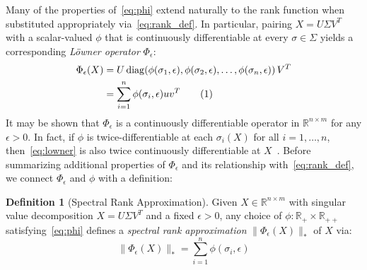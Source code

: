 \documentclass[10pt]{article}
\numberwithin{equation}{section}
\newcommand{\+}{%
	\raisebox{0.18ex}{\scaleobj{0.55}{+}}
}
\theoremstyle{definition}
\newtheorem{definition}{Definition}
\theoremstyle{definition}
\newcommand\numberthis{\addtocounter{equation}{1}\tag{\theequation}}
\begin{document}
Many of the properties of~\eqref{eq:phi} extend naturally to the rank function when substituted appropriately via~\eqref{eq:rank_def}.
In particular, pairing $X = U\Sigma V^T$ with a scalar-valued $\phi$ that is continuously differentiable at every $\sigma \in \Sigma$ yields a corresponding \emph{Löwner operator} $\Phi_\epsilon$: 
\begin{align*}\label{eq:lowner}
 \Phi_\epsilon (X) & = U \, \mathrm{diag}( \phi(\sigma_1, \epsilon), \phi(\sigma_2, \epsilon), \dots, \phi(\sigma_n, \epsilon)) \, V^T \\
 & = \sum\limits_{i=1}^{n} \phi(\sigma_i, \epsilon) u v^T\numberthis
\end{align*}
It may be shown that $\Phi_\epsilon$ is a continuously differentiable operator in $\mathbb{R}^{n \times m}$ for any $\epsilon > 0$. 
In fact, if $\phi$ is twice-differentiable at each $\sigma_i(X)$ for all $i = 1, \dots, n$, then~\eqref{eq:lowner} is also twice continuously differentiable at $X$~\cite{ding2018spectral}. 
Before summarizing additional properties of $\Phi_\epsilon$ and its relationship with~\eqref{eq:rank_def}, we connect $\Phi_\epsilon$ and $\phi$ with a definition:
\begin{definition}[Spectral Rank Approximation]
	Given $X \in \mathbb{R}^{n \times m}$ with singular value decomposition $X = U \Sigma V^T$ and a fixed $\epsilon > 0$, any choice of $\phi: \mathbb{R}_+ \times \mathbb{R}_{++}$ satisfying~\eqref{eq:phi} defines a \emph{spectral rank approximation} $\lVert \Phi_\epsilon(X) \rVert_\ast$ of $X$ via: 
	\begin{equation}\label{def:cont_rank}
		\lVert \Phi_\epsilon(X) \rVert_\ast = \sum\limits_{i=1}^n \phi(\sigma_i, \epsilon)
	\end{equation}
\end{definition}
\end{document}
